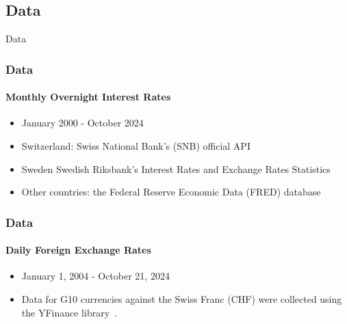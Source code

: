 \documentclass[10pt]{beamer}
\begin{document}
\begin{frame}
\section{Data}
\centering \LARGE Data
\end{frame}
\begin{frame}
\frametitle{Data}
\framesubtitle{Monthly Overnight Interest Rates}
\begin{itemize}
    \item January 2000 - October 2024
    \item Switzerland: Swiss National Bank's (SNB) official API~\cite{snb}
    \item Sweden Swedish Riksbank’s Interest Rates and Exchange Rates Statistics~\cite{riksbank}
    \item Other countries: the Federal Reserve Economic Data (FRED) database~\cite{fred}
\end{itemize}
\end{frame}
\begin{frame}
\frametitle{Data}
\framesubtitle{Daily Foreign Exchange Rates}
\begin{itemize}
    \item January 1, 2004 - October 21, 2024
    \item Data for G10 currencies against the Swiss Franc (CHF) were collected using the YFinance library~\cite{yfinance}. 
\end{itemize}
\end{frame}
\end{document}
